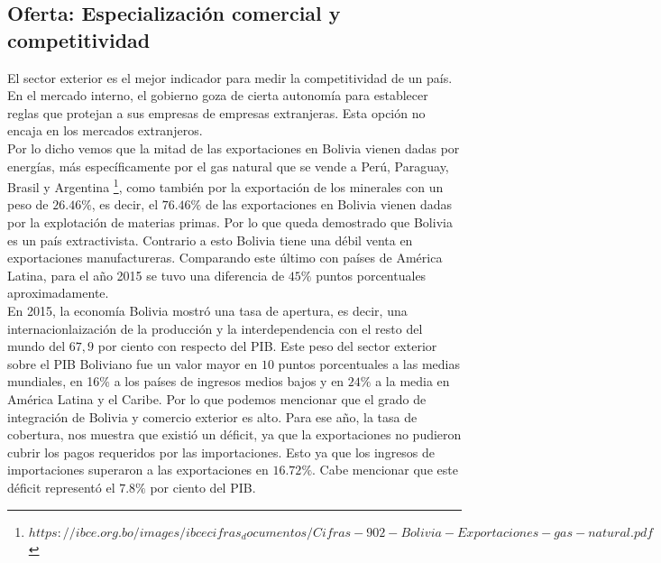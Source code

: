     \subsection{Oferta: Especialización comercial y competitividad}
    El sector exterior es el mejor indicador para medir la competitividad de un país. En el mercado interno, el gobierno goza de cierta autonomía para establecer reglas que protejan a sus empresas de empresas extranjeras. Esta opción no encaja en los mercados extranjeros.\\
    Por lo dicho vemos que la mitad de las exportaciones en Bolivia vienen dadas por energías, más específicamente por el gas natural que se vende a Perú, Paraguay, Brasil y Argentina \footnote{$https://ibce.org.bo/images/ibcecifras_documentos/Cifras-902-Bolivia-Exportaciones-gas-natural.pdf$}, como también por la exportación de los minerales con un peso de $26.46\%$, es decir, el $76.46\%$ de las exportaciones en Bolivia vienen dadas por la explotación de materias primas. Por lo que queda demostrado que Bolivia es un país extractivista. Contrario a esto Bolivia tiene una débil venta en exportaciones manufactureras. Comparando este último con países de América Latina, para el año 2015 se tuvo una diferencia de $45 \%$ puntos porcentuales aproximadamente.\\
    En 2015, la economía Bolivia mostró una tasa de apertura, es decir, una internacionlaización de la producción y la interdependencia con el resto del mundo del $67,9$ por ciento con respecto del PIB. Este peso del sector exterior sobre el PIB Boliviano fue un valor mayor en $10$ puntos porcentuales a las medias mundiales, en 16\% a los países de ingresos medios bajos y en $24\%$ a la media en América Latina y el Caribe. Por lo que podemos mencionar que el grado de integración de Bolivia y comercio exterior es alto. Para ese año, la tasa de cobertura, nos muestra que existió un déficit, ya que la exportaciones no pudieron cubrir los pagos requeridos por las importaciones. Esto  ya que los ingresos de importaciones superaron a las  exportaciones en  $16.72 \%$. Cabe mencionar que este déficit representó el $7.8\%$  por ciento del PIB.\\



